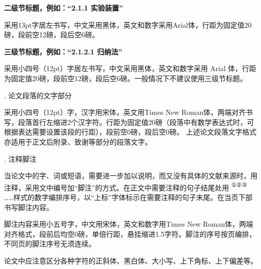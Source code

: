 \documentclass{Diploma}
\begin{document}
\textbf{二级节标题，例如：“2.1.1 实验装置”}

采用13pt字居左书写，中文采用黑体，英文和数字采用Arial体，行距为固定值20磅，段前空12磅，段后空6磅。

\textbf{三级节标题，例如：“2.1.2.1 归纳法”}

采用小四号（12pt）字居左书写，中文采用黑体，英文和数字采用 Arial 体，行距为固定值20磅，段前空12磅，段后空6磅。一般情况下不建议使用三级节标题。

. 论文段落的文字部分

采用小四号（12pt）字，汉字用宋体，英文用Times New Roman体，两端对齐书写，段落首行左缩进2个汉字符。行距为固定值20磅（段落中有数学表达式时，可根据表达需要设置该段的行距），段前空0磅，段后空0磅。
上述论文段落文字格式亦适用于正文后附录、致谢等部分的段落文字。

. 注释脚注

当论文中的字、词或短语，需要进一步加以说明，而又没有具体的文献来源时，用注释，采用文中编号加“脚注”的方式。在正文中需要注释的句子结尾处用%
\begingroup\setmainfont{SimSun}\textsuperscript{①②③}\endgroup
……样式的数字编排序号，以“上标”字体标示在需要注释的句子末尾。在当页下部书写脚注内容。

脚注内容采用小五号字，中文用宋体，英文和数字用Times New Roman体，两端对齐格式，段前后均空0磅，单倍行距，悬挂缩进1.5字符。脚注的序号按页编排，不同页的脚注序号无须连续。

论文中应注意区分各种字符的正斜体、黑白体、大小写、上下角标、上下偏差等。
\end{document}
